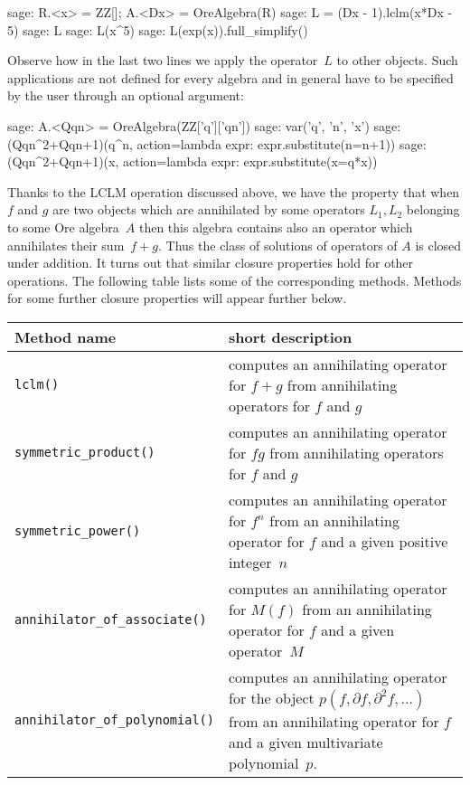 \documentclass[11pt]{amsart}
\begin{document}
\begin{sageexample}
  sage: R.<x> = ZZ[]; A.<Dx> = OreAlgebra(R)
  sage: L = (Dx - 1).lclm(x*Dx - 5)
  sage: L
  sage: L(x^5)
  sage: L(exp(x)).full_simplify() 
\end{sageexample}

Observe how in the last two lines we apply the operator~$L$ to other
objects. Such applications are not defined for every algebra and in general have
to be specified by the user through an optional argument:

\begin{sageexample}
  sage: A.<Qqn> = OreAlgebra(ZZ['q']['qn'])
  sage: var('q', 'n', 'x')
  sage: (Qqn^2+Qqn+1)(q^n, action=lambda expr: expr.substitute(n=n+1))
  sage: (Qqn^2+Qqn+1)(x, action=lambda expr: expr.substitute(x=q*x))
\end{sageexample}

Thanks to the LCLM operation discussed above, we have the property that when $f$
and $g$ are two objects which are annihilated by some operators $L_1,L_2$
belonging to some Ore algebra~$A$ then this algebra contains also an operator
which annihilates their sum~$f+g$. Thus the class of solutions of operators of
$A$ is closed under addition. It turns out that similar closure properties hold
for other operations. The following table lists some of the corresponding
methods. Methods for some further closure properties will appear further below.

\begin{center}
\begin{tabular}{|l|p{.55\hsize}|}
\hline
Method name & short description \\\hline
\verb|lclm()| & computes an annihilating operator for $f+g$ from annihilating operators for $f$ and $g$ \\
\verb|symmetric_product()| & computes an annihilating operator for $fg$ from annihilating operators for $f$ and $g$ \\
\verb|symmetric_power()| & computes an annihilating operator for $f^n$ from an annihilating operator for $f$ and a given positive integer~$n$\\ 
\verb|annihilator_of_associate()| & computes an annihilating operator for $M(f)$ from an annihilating operator for $f$ and a given operator~$M$\\ 
\verb|annihilator_of_polynomial()| & computes an annihilating operator for the object $p(f,\partial f,\partial^2 f,\dots)$ from an annihilating operator for $f$ and a given multivariate polynomial~$p$. \\
\hline
\end{tabular}
\end{center}
\end{document}
